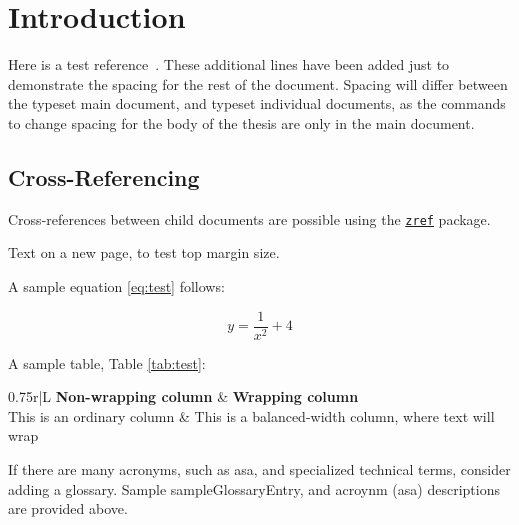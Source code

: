 \documentclass[\main/thesis.tex]{subfiles}
\begin{document}
\chapter{Introduction}

Here is a test reference~\cite{Knuth68:art_of_programming}.
These additional lines have been added just to demonstrate the spacing
for the rest of the document. Spacing will differ between the typeset main
document, and typeset individual documents, as the commands
to change spacing for the body of the thesis are only in the main document.

\section{Cross-Referencing}\label{sec:crossRef}

Cross-references between child documents are possible using the
\href{https://www.ctan.org/pkg/zref}{\texttt{zref}} package.

\newpage

Text on a new page, to test top margin size.

A sample equation \eqref{eq:test} follows:

\begin{equation}
y = \frac{1}{x^2} + 4 \label{eq:test}
\end{equation}

A sample table, Table \ref{tab:test}:

\begin{table}[h]
    \centering
    \begin{tabulary}{0.75\textwidth}{r|L}
    \textbf{Non-wrapping column} & \textbf{Wrapping column} \\ \hline
    This is an ordinary column & This is a balanced-width column, where text will wrap
    \end{tabulary}
    \caption[A sample table] {A sample table created using the \href{https://ctan.org/pkg/tabulary}{\texttt{tabulary}} package}
    \label{tab:test}
\end{table}

If there are many acronyms, such as \gls{asa}, and specialized technical terms, consider adding a glossary.
Sample \gls{sampleGlossaryEntry}, and acroynm (\gls{asa}) descriptions are provided above.
\end{document}
